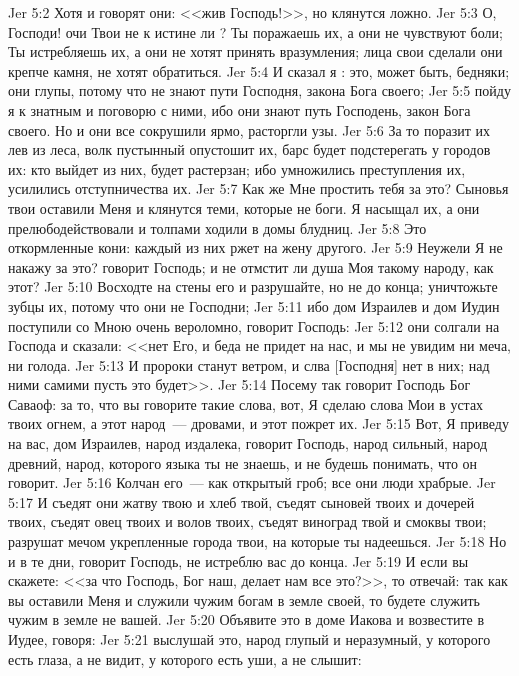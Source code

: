 \vs Jer 5:2 Хотя и говорят они: <<жив Господь!>>, но клянутся ложно.
\vs Jer 5:3 О, Господи! очи Твои не к истине ли ? Ты поражаешь их, а они не чувствуют боли; Ты истребляешь их, а они не хотят принять вразумления; лица свои сделали они крепче камня, не хотят обратиться.
\vs Jer 5:4 И сказал я : это, может быть, бедняки; они глупы, потому что не знают пути Господня, закона Бога своего;
\vs Jer 5:5 пойду я к знатным и поговорю с ними, ибо они знают путь Господень, закон Бога своего. Но и они все сокрушили ярмо, расторгли узы.
\vs Jer 5:6 За то поразит их лев из леса, волк пустынный опустошит их, барс будет подстерегать у городов их: кто выйдет из них, будет растерзан; ибо умножились преступления их, усилились отступничества их.
\vs Jer 5:7 Как же Мне простить тебя за это? Сыновья твои оставили Меня и клянутся теми, которые не боги. Я насыщал их, а они прелюбодействовали и толпами ходили в домы блудниц.
\vs Jer 5:8 Это откормленные кони: каждый из них ржет на жену другого.
\vs Jer 5:9 Неужели Я не накажу за это? говорит Господь; и не отмстит ли душа Моя такому народу, как этот?
\vs Jer 5:10 Восходте на стены его и разрушайте, но не до конца; уничтожьте зубцы их, потому что они не Господни;
\vs Jer 5:11 ибо дом Израилев и дом Иудин поступили со Мною очень вероломно, говорит Господь:
\vs Jer 5:12 они солгали на Господа и сказали: <<нет Его, и беда не придет на нас, и мы не увидим ни меча, ни голода.
\vs Jer 5:13 И пророки станут ветром, и слва [Господня] нет в них; над ними самими пусть это будет>>.
\rsbpar\vs Jer 5:14 Посему так говорит Господь Бог Саваоф: за то, что вы говорите такие слова, вот, Я сделаю слова Мои в устах твоих огнем, а этот народ~--- дровами, и этот  пожрет их.
\vs Jer 5:15 Вот, Я приведу на вас, дом Израилев, народ издалека, говорит Господь, народ сильный, народ древний, народ, которого языка ты не знаешь, и не будешь понимать, что он говорит.
\vs Jer 5:16 Колчан его~--- как открытый гроб; все они люди храбрые.
\vs Jer 5:17 И съедят они жатву твою и хлеб твой, съедят сыновей твоих и дочерей твоих, съедят овец твоих и волов твоих, съедят виноград твой и смоквы твои; разрушат мечом укрепленные города твои, на которые ты надеешься.
\vs Jer 5:18 Но и в те дни, говорит Господь, не истреблю вас до конца.
\vs Jer 5:19 И если вы скажете: <<за что Господь, Бог наш, делает нам все это?>>, то отвечай: так как вы оставили Меня и служили чужим богам в земле своей, то будете служить чужим в земле не вашей.
\rsbpar\vs Jer 5:20 Объявите это в доме Иакова и возвестите в Иудее, говоря:
\vs Jer 5:21 выслушай это, народ глупый и неразумный, у которого есть глаза, а не видит, у которого есть уши, а не слышит:
